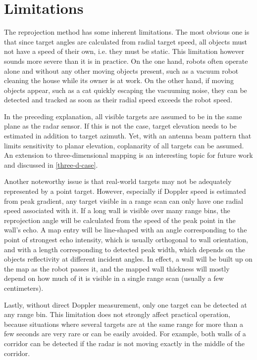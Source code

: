 \section{Limitations}\label{limitations}

The reprojection method has some inherent limitations. The most obvious one is that since target angles are calculated from radial target speed, all objects must not have a speed of their own, i.e. they must be static. This limitation however sounds more severe than it is in practice. On the one hand, robots often operate alone and without any other moving objects present, such as a vacuum robot cleaning the house while its owner is at work. On the other hand, if moving objects appear, such as a cat quickly escaping the vacuuming noise, they can be detected and tracked as soon as their radial speed exceeds the robot speed.

In the preceding explanation, all visible targets are assumed to be in the same plane as the radar sensor. If this is not the case, target elevation needs to be estimated in addition to target azimuth. Yet, with an antenna beam pattern that limits sensitivity to planar elevation, coplanarity of all targets can be assumed. An extension to three-dimensional mapping is an interesting topic for future work and discussed in \cref{three-d-case}.

Another noteworthy issue is that real-world targets may not be adequately represented by a point target. However, especially if Doppler speed is estimated from peak gradient, any target visible in a range scan can only have one radial speed associated with it. If a long wall is visible over many range bins, the reprojection angle will be calculated from the speed of the peak point in the wall's echo. A map entry will be line-shaped with an angle corresponding to the point of strongest echo intensity, which is usually orthogonal to wall orientation, and with a length corresponding to detected peak width, which depends on the objects reflectivity at different incident angles. In effect, a wall will be built up on the map as the robot passes it, and the mapped wall thickness will mostly depend on how much of it is visible in a single range scan (usually a few centimeters).

Lastly, without direct Doppler measurement, only one target can be detected at any range bin. This limitation does not strongly affect practical operation, because situations where several targets are at the same range for more than a few seconds are very rare or can be easily avoided. For example, both walls of a corridor can be detected if the radar is not moving exactly in the middle of the corridor.
